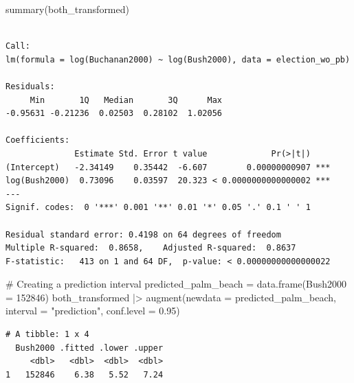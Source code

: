 \documentclass[
  letterpaper,
  DIV=11,
  numbers=noendperiod]{scrartcl}
\newenvironment{Shaded}{\begin{snugshade}}{\end{snugshade}}
\newcommand{\AttributeTok}[1]{\textcolor[rgb]{0.40,0.45,0.13}{#1}}
\newcommand{\CommentTok}[1]{\textcolor[rgb]{0.37,0.37,0.37}{#1}}
\newcommand{\DecValTok}[1]{\textcolor[rgb]{0.68,0.00,0.00}{#1}}
\newcommand{\FloatTok}[1]{\textcolor[rgb]{0.68,0.00,0.00}{#1}}
\newcommand{\FunctionTok}[1]{\textcolor[rgb]{0.28,0.35,0.67}{#1}}
\newcommand{\NormalTok}[1]{\textcolor[rgb]{0.00,0.23,0.31}{#1}}
\newcommand{\OtherTok}[1]{\textcolor[rgb]{0.00,0.23,0.31}{#1}}
\newcommand{\SpecialCharTok}[1]{\textcolor[rgb]{0.37,0.37,0.37}{#1}}
\newcommand{\StringTok}[1]{\textcolor[rgb]{0.13,0.47,0.30}{#1}}
\begin{document}
\begin{Shaded}
\begin{Highlighting}[]
\FunctionTok{summary}\NormalTok{(both\_transformed)}
\end{Highlighting}
\end{Shaded}

\begin{verbatim}

Call:
lm(formula = log(Buchanan2000) ~ log(Bush2000), data = election_wo_pb)

Residuals:
     Min       1Q   Median       3Q      Max 
-0.95631 -0.21236  0.02503  0.28102  1.02056 

Coefficients:
              Estimate Std. Error t value             Pr(>|t|)    
(Intercept)   -2.34149    0.35442  -6.607        0.00000000907 ***
log(Bush2000)  0.73096    0.03597  20.323 < 0.0000000000000002 ***
---
Signif. codes:  0 '***' 0.001 '**' 0.01 '*' 0.05 '.' 0.1 ' ' 1

Residual standard error: 0.4198 on 64 degrees of freedom
Multiple R-squared:  0.8658,    Adjusted R-squared:  0.8637 
F-statistic:   413 on 1 and 64 DF,  p-value: < 0.00000000000000022
\end{verbatim}

\begin{Shaded}
\begin{Highlighting}[]
\CommentTok{\# Creating a prediction interval}
\NormalTok{predicted\_palm\_beach }\OtherTok{=} \FunctionTok{data.frame}\NormalTok{(}\AttributeTok{Bush2000 =} \DecValTok{152846}\NormalTok{)}
\NormalTok{both\_transformed }\SpecialCharTok{|\textgreater{}} \FunctionTok{augment}\NormalTok{(}\AttributeTok{newdata =}\NormalTok{ predicted\_palm\_beach, }\AttributeTok{interval =} \StringTok{"prediction"}\NormalTok{, }\AttributeTok{conf.level =} \FloatTok{0.95}\NormalTok{)}
\end{Highlighting}
\end{Shaded}

\begin{verbatim}
# A tibble: 1 x 4
  Bush2000 .fitted .lower .upper
     <dbl>   <dbl>  <dbl>  <dbl>
1   152846    6.38   5.52   7.24
\end{verbatim}
\end{document}

